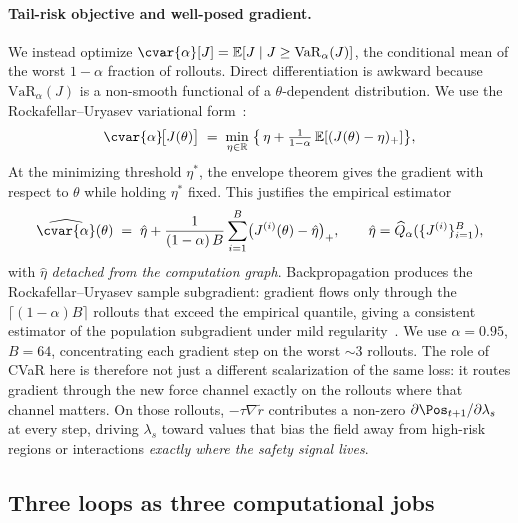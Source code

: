 \paragraph{Tail-risk objective and well-posed gradient.}
We instead optimize $\cvar{\alpha}[J] = \mathbb{E}[J \mid J \geq
\mathrm{VaR}_\alpha(J)]$, the conditional mean of the worst $1{-}\alpha$
fraction of rollouts. Direct differentiation is awkward because
$\mathrm{VaR}_\alpha(J)$ is a non-smooth functional of a
$\theta$-dependent distribution. We use the Rockafellar–Uryasev
variational form~\citep{rockafellar2000optimization}:
\begin{equation}
\cvar{\alpha}\!\bigl[J(\theta)\bigr]
\;=\;
\min_{\eta \in \mathbb{R}}\;
\bigl\{\,\eta + \tfrac{1}{1-\alpha}\,
\mathbb{E}[(J(\theta) - \eta)_+]\bigr\},
\label{eq:method:cvar_var}
\end{equation}
At the minimizing threshold $\eta^*$, the envelope theorem gives the
gradient with respect to $\theta$ while holding $\eta^*$ fixed. This
justifies the empirical estimator
\begin{equation}
\widehat{\cvar{\alpha}}(\theta)
\;=\;
\hat\eta + \frac{1}{(1-\alpha)\,B}\sum_{i=1}^B \bigl(J^{(i)}(\theta) - \hat\eta\bigr)_{+},
\qquad
\hat\eta = \widehat{Q}_\alpha(\{J^{(i)}\}_{i=1}^B),
\label{eq:method:cvar_emp}
\end{equation}
with $\hat\eta$ \emph{detached from the computation graph}.
Backpropagation produces the Rockafellar–Uryasev sample subgradient:
gradient flows only through the $\lceil(1-\alpha)B\rceil$ rollouts that
exceed the empirical quantile, giving a consistent estimator of the
population subgradient under mild regularity~\citep{hong2014monte}. We use
$\alpha = 0.95$, $B = 64$, concentrating each gradient step on the
worst $\sim 3$ rollouts. The role of CVaR here is therefore not just
a different scalarization of the same loss: it routes gradient
through the new force channel exactly on the rollouts where that
channel matters. On those rollouts, $-\tau\nabla\tilde r$ contributes
a non-zero $\partial \Pos_{t+1}/\partial \lambda_s$ at every step,
driving $\lambda_s$ toward values that bias the field away from
high-risk regions or interactions \emph{exactly where the safety signal lives}.

\subsection{Three loops as three computational jobs}
\label{sec:method:loops}

